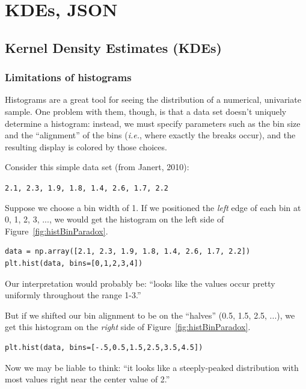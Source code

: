 
\chapter{KDEs, JSON}
\label{ch:KDEs}

\section{Kernel Density Estimates (KDEs)}

\subsection{Limitations of histograms}

Histograms are a great tool for seeing the distribution of a numerical,
univariate sample. One problem with them, though, is that a data set doesn't
uniquely determine a histogram: instead, we must specify parameters such as
the bin size and the ``alignment'' of the bins (\textit{i.e.}, where exactly
the breaks occur), and the resulting display is colored by those choices.

Consider this simple data set (from Janert, 2010):

\begin{center}
\texttt{2.1, 2.3, 1.9, 1.8, 1.4, 2.6, 1.7, 2.2}
\end{center}

Suppose we choose a bin width of 1. If we positioned the \textit{left} edge of
each bin at 0, 1, 2, 3, ..., we would get the histogram on the left side of
Figure~\ref{fig:histBinParadox}.

\begin{Verbatim}[fontsize=\footnotesize,samepage=true,frame=single]
data = np.array([2.1, 2.3, 1.9, 1.8, 1.4, 2.6, 1.7, 2.2])
plt.hist(data, bins=[0,1,2,3,4])
\end{Verbatim}

Our interpretation would probably be: ``looks like the values occur pretty
uniformly throughout the range 1-3.''

But if we shifted our bin alignment to be on the ``halves'' (0.5, 1.5, 2.5,
...), we get this histogram on the \textit{right} side of
Figure~\ref{fig:histBinParadox}.

\begin{Verbatim}[fontsize=\footnotesize,samepage=true,frame=single]
plt.hist(data, bins=[-.5,0.5,1.5,2.5,3.5,4.5])
\end{Verbatim}

Now we may be liable to think: ``it looks like a steeply-peaked distribution
with most values right near the center value of 2.''

